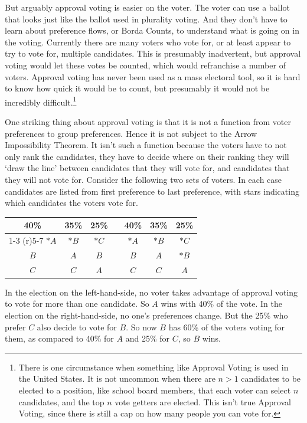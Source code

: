 \documentclass[openany]{book}
\begin{document}
But arguably approval voting is easier on the voter. The voter can use a ballot that looks just like the ballot used in plurality voting. And they don't have to learn about preference flows, or Borda Counts, to understand what is going on in the voting. Currently there are many voters who vote for, or at least appear to try to vote for, multiple candidates. This is presumably inadvertent, but approval voting would let these votes be counted, which would refranchise a number of voters. Approval voting has never been used as a mass electoral tool, so it is hard to know how quick it would be to count, but presumably it would not be incredibly difficult.\footnote{There is one circumstance when something like Approval Voting is used in the United States. It is not uncommon when there are $n > 1$ candidates to be elected to a position, like school board members, that each voter can select $n$ candidates, and the top $n$ vote getters are elected. This isn't true Approval Voting, since there is still a cap on how many people you can vote for.}

One striking thing about approval voting is that it is not a function from voter preferences to group preferences. Hence it is not subject to the Arrow Impossibility Theorem. It isn't such a function because the voters have to not only rank the candidates, they have to decide where on their ranking they will `draw the line' between candidates that they will vote for, and candidates that they will not vote for. Consider the following two sets of voters. In each case candidates are listed from first preference to last preference, with stars indicating which candidates the voters vote for.


\begin{center}
\begin{tabular}{c c c p{100pt} c c c}
40\% & 35\% & 25\% & & 40\% & 35\% & 25\% \\
\cmidrule(r){1-3}
\cmidrule(r){5-7}
$*A$ & $*B$ & $*C$ & & $*A$ & $*B$ & $*C$ \\
$B$ & $A$ & $B$ & & $B$ & $A$ & $*B$ \\
$C$ & $C$ & $A$ & & $C$ & $C$ & $A$
\end{tabular}
\end{center}
In the election on the left-hand-side, no voter takes advantage of approval voting to vote for more than one candidate. So $A$ wins with 40\% of the vote. In the election on the right-hand-side, no one's preferences change. But the 25\% who prefer $C$ also decide to vote for $B$. So now $B$ has 60\% of the voters voting for them, as compared to 40\% for $A$ and 25\% for $C$, so $B$ wins.
\end{document}

